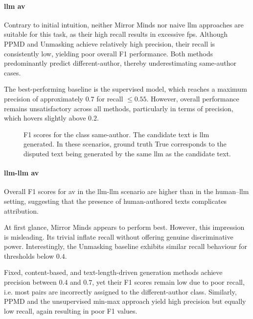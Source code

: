 \paragraph{\ac{llm} \ac{av}}

Contrary to initial intuition, neither Mirror Minds nor naive \ac{llm} approaches are suitable for this task, as their high recall results in excessive \acp{fp}.  
Although PPMD and Unmasking achieve relatively high precision, their recall is consistently low, yielding poor overall F1 performance.  
Both methods predominantly predict different-author, thereby underestimating same-author cases.  

The best-performing baseline is the supervised model, which reaches a maximum precision of approximately $0.7$ for recall $\leq 0.55$.  
However, overall performance remains unsatisfactory across all methods, particularly in terms of precision, which hovers slightly above $0.2$.


\begin{figure}[b]
  \centering
  
  \caption{F1 scores for the class same-author. 
The candidate text is \ac{llm} generated.
In these scenarios, ground truth True corresponds to the disputed text being generated by the same \ac{llm} as the candidate text.
}
  \label{fig:llm_av_prec}
\end{figure}



\paragraph{\ac{llm}-\ac{llm} \ac{av}}

Overall F1 scores for \ac{av} in the \ac{llm}-\ac{llm} scenario are higher than in the human–\ac{llm} setting, suggesting that the presence of human-authored texts complicates attribution.  

At first glance, Mirror Minds appears to perform best. 
However, this impression is misleading.  
Its trivial \imps{} inflate recall without offering genuine discriminative power.  
Interestingly, the Unmasking baseline exhibits similar recall behaviour for thresholds below $0.4$.  

Fixed, content-based, and text-length-driven \imp{} generation methods achieve precision between $0.4$ and $0.7$, yet their F1 scores remain low due to poor recall, i.e. most pairs are incorrectly assigned to the different-author class.  
Similarly, PPMD and the unsupervised min-max approach yield high precision but equally low recall, again resulting in poor F1 values.  


